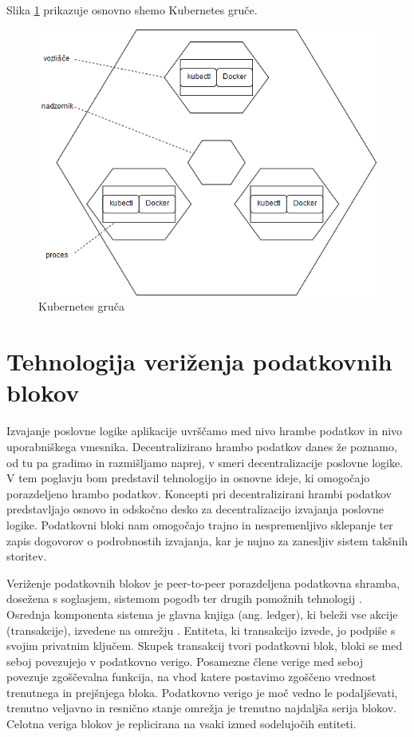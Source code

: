 \documentclass[a4paper, 12pt]{book}
\begin{document}
Slika \ref{kubernetes_cluster} prikazuje osnovno shemo Kubernetes gruče.

\begin{figure}[h]
	\includegraphics[width=1.0\textwidth]{slike/kubernetes_cluster.png}
	\caption{Kubernetes gruča \cite{kubernetesTutorial}}
	\label{kubernetes_cluster}
\end{figure}


\chapter{Tehnologija veriženja podatkovnih blokov}
\label{ch2}

Izvajanje poslovne logike aplikacije uvrščamo med nivo hrambe podatkov in nivo uporabniškega vmesnika.
Decentralizirano hrambo podatkov danes že poznamo, od tu pa gradimo in razmišljamo naprej, v smeri decentralizacije poslovne logike.
V tem poglavju bom predstavil tehnologijo in osnovne ideje, ki omogočajo porazdeljeno hrambo podatkov.
Koncepti pri decentralizirani hrambi podatkov predstavljajo osnovo in odskočno desko za decentralizacijo izvajanja poslovne logike.
Podatkovni bloki nam omogočajo trajno in nespremenljivo sklepanje ter zapis dogovorov o podrobnostih izvajanja, kar je nujno za zanesljiv sistem takšnih storitev.

Veriženje podatkovnih blokov je peer-to-peer porazdeljena podatkovna shramba, dosežena s soglasjem, sistemom  pogodb ter drugih pomožnih tehnologij \cite{hyperledgerWeb}. Osrednja komponenta sistema je glavna knjiga (ang. ledger), ki beleži vse akcije (transakcije), izvedene na omrežju \cite{hyperledgerDocs}.
Entiteta, ki transakcijo izvede, jo podpiše s svojim privatnim ključem.
Skupek transakcij tvori podatkovni blok, bloki se med seboj povezujejo v podatkovno verigo.
Posamezne člene verige med seboj povezuje zgoščevalna funkcija, na vhod katere postavimo zgoščeno vrednost trenutnega in prejšnjega bloka.
Podatkovno verigo je moč vedno le podaljševati, trenutno veljavno in resnično stanje omrežja je trenutno najdaljša serija blokov.
Celotna veriga blokov je replicirana na vsaki izmed sodelujočih entiteti.
\end{document}

